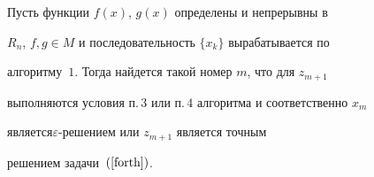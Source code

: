 \begin{thm}


Пусть функции $f(x)$, $g(x)$ определены и непрерывны в


$R_n$, $f,g\in M$ и последовательность $\{x_k\}$ вырабатывается по


алгоритму~$1$. Тогда найдется такой номер $m$, что для $z_{m+1}$


выполняются условия п.\,$3$ или п.\,$4$ алгоритма и соответственно $x_m$


является\linebreak $\varepsilon$-решением или $z_{m+1}$ является точным


решением задачи~$(\ref{forth})$.


\end{thm}





